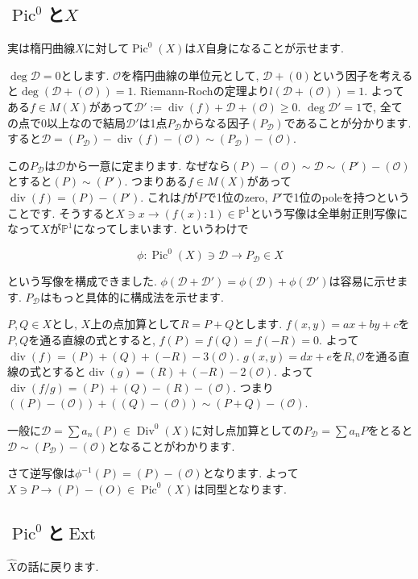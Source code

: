 \documentclass{jsarticle}
\newcommand{\PP}{\mathbb{P}}
\newcommand{\makeop}[1]{\mathop{\mathrm{#1}}\nolimits}
\def\Ext{\makeop{Ext}}
\def\Pic{\makeop{Pic}}
\def\Div{\makeop{Div}}
\def\div{\makeop{div}}
\theoremstyle{definition}
\numberwithin{theorem}{section}
\begin{document}
\subsection{$\Pic^0$と$X$}
実は楕円曲線$X$に対して$\Pic^0(X)$は$X$自身になることが示せます.

$\deg \mathcal{D} = 0$とします. $\mathcal{O}$を楕円曲線の単位元として, $\mathcal{D} + (0)$という因子を考えると$\deg(\mathcal{D} + (\mathcal{O})) = 1$. Riemann-Rochの定理より$l(\mathcal{D} + (\mathcal{O})) = 1$. よってある$f \in M(X)$があって$\mathcal{D}' := \div(f) + \mathcal{D} + (\mathcal{O}) \geq 0$. $\deg \mathcal{D}' = 1$で, 全ての点で0以上なので結局$\mathcal{D}'$は1点$P_\mathcal{D}$からなる因子$(P_\mathcal{D})$であることが分かります. すると$\mathcal{D} = (P_\mathcal{D}) - \div(f) - (\mathcal{O}) \sim (P_\mathcal{D}) - (\mathcal{O})$.

この$P_\mathcal{D}$は$\mathcal{D}$から一意に定まります. なぜなら$(P) - (\mathcal{O}) \sim \mathcal{D} \sim (P') - (\mathcal{O})$とすると$(P)\sim(P')$. つまりある$f\in M(X)$があって$\div(f) = (P) - (P')$. これは$f$が$P$で1位のzero, $P'$で1位のpoleを持つということです. そうすると$X \ni x \rightarrow (f(x):1) \in \PP^1$という写像は全単射正則写像になって$X$が$\PP^1$になってしまいます. というわけで

\begin{equation*}
\phi: \Pic^0(X) \ni \mathcal{D} \rightarrow P_\mathcal{D} \in X
\end{equation*}

という写像を構成できました. $\phi(\mathcal{D} + \mathcal{D}') = \phi(\mathcal{D}) + \phi(\mathcal{D}')$は容易に示せます. $P_\mathcal{D}$はもっと具体的に構成法を示せます.

$P, Q \in X$とし, $X$上の点加算として$R = P+Q$とします. $f(x, y) = ax+by+c$を$P, Q$を通る直線の式とすると, $f(P) = f(Q) = f(-R) = 0$. よって$\div(f) = (P) + (Q) + (-R) - 3(\mathcal{O})$. $g(x, y) = dx+e$を$R, \mathcal{O}$を通る直線の式とすると$\div(g) = (R) + (-R) - 2(\mathcal{O})$. よって$\div(f/g) = (P) + (Q) - (R) - (\mathcal{O})$. つまり$((P) - (\mathcal{O})) + ((Q) - (\mathcal{O})) \sim (P+Q) - (\mathcal{O})$.

一般に$\mathcal{D} = \sum a_n(P) \in \Div^0(X)$に対し点加算としての$P_\mathcal{D} = \sum a_n P$をとると$\mathcal{D} \sim (P_\mathcal{D}) - (\mathcal{O})$となることがわかります. 

さて逆写像は$\phi^{-1}(P) = (P) - (\mathcal{O})$となります. よって$X \ni P \rightarrow (P) - (O) \in \Pic^0(X)$は同型となります. 

\subsection{$\Pic^0$と$\Ext$}
$\hat{X}$の話に戻ります.
\end{document}
